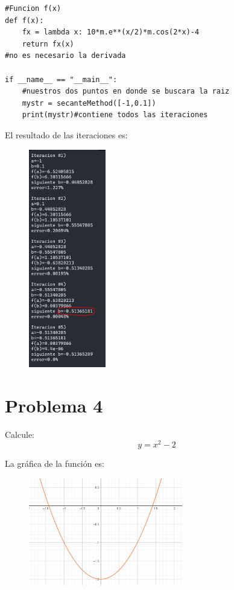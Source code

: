 \documentclass[a4paper,12pt]{article}
\begin{document}
\begin{lstlisting}
#Funcion f(x)
def f(x):
    fx = lambda x: 10*m.e**(x/2)*m.cos(2*x)-4
    return fx(x)
#no es necesario la derivada

if __name__ == "__main__":
    #nuestros dos puntos en donde se buscara la raiz
    mystr = secanteMethod([-1,0.1])
    print(mystr)#contiene todos las iteraciones
\end{lstlisting}
    El resultado de las iteraciones es:
    \begin{figure}[h]
        \centering
        \includegraphics[width=0.3\textwidth]{f3console.PNG}
    \end{figure}
    \newpage
    \section{Problema 4}
    Calcule:
    \begin{equation}
        y =  x^2 - 2        
    \end{equation}
    
    La gráfica de la función es:
    \begin{figure}[h]
        \centering
        \includegraphics[width=0.6\textwidth]{f4.PNG}
    \end{figure}
\end{document}
